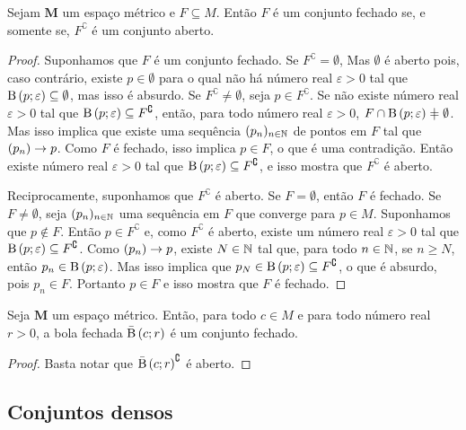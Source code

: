 \begin{proposition}
Sejam $\bm M$ um espaço métrico e $F \subseteq M$. Então $F$ é um conjunto fechado se, e somente se, $F^\complement$ é um conjunto aberto.
\end{proposition}
\begin{proof}
Suponhamos que $F$ é um conjunto fechado. Se $F^\complement = \emptyset$, Mas $\emptyset$ é aberto pois, caso contrário, existe $p \in \emptyset$ para o qual não há número real $\varepsilon > 0$ tal que $\mathrm{B}\left(p; \varepsilon\right) \subseteq \emptyset$, mas isso é absurdo. Se $F^\complement \neq \emptyset$, seja $p \in F^\complement$. Se não existe número real $\varepsilon > 0$ tal que $\mathrm{B}\left(p; \varepsilon\right) \subseteq F^\complement$, então, para todo número real $\varepsilon > 0$, $F \cap \bola{p}{\varepsilon} \neq \emptyset$. Mas isso implica que existe uma sequência $(p_n)_{n \in \mathbb{N}}$ de pontos em $F$ tal que $(p_n) \rightarrow p$. Como $F$ é fechado, isso implica $p \in F$, o que é uma contradição. Então existe número real $\varepsilon > 0$ tal que $\mathrm{B}\left(p; \varepsilon\right) \subseteq F^\complement$, e isso mostra que $F^\complement$ é aberto.

Reciprocamente, suponhamos que $F^\complement$ é aberto. Se $F = \emptyset$, então $F$ é fechado. Se $F \neq \emptyset$, seja $(p_n)_{n \in \mathbb{N}}$ uma sequência em $F$ que converge para $p \in M$. Suponhamos que $p \notin F$. Então $p \in F^\complement$ e, como $F^\complement$ é aberto, existe um número real $\varepsilon > 0$ tal que $\mathrm{B}\left(p; \varepsilon\right) \subseteq F^\complement$. Como $(p_n) \rightarrow p$, existe $N \in \mathbb{N}$ tal que, para todo $n \in \mathbb{N}$, se $n \geq N$, então $p_n \in \mathrm{B}\left(p; \varepsilon\right)$. Mas isso implica que $p_N \in \mathrm{B}\left(p; \varepsilon\right) \subseteq F^\complement$, o que é absurdo, pois $p_n \in F$. Portanto $p \in F$ e isso mostra que $F$ é fechado.
\end{proof}

\begin{proposition}
Seja $\bm M$ um espaço métrico. Então, para todo $c \in M$ e para todo número real $r > 0$, a bola fechada $\bar{\mathrm{B}}\left(c; r\right)$ é um conjunto fechado.
\end{proposition}
\begin{proof}
Basta notar que $\bar{\mathrm{B}}\left(c; r\right)^\complement$ é aberto.
\end{proof}

\subsection{Conjuntos densos}

